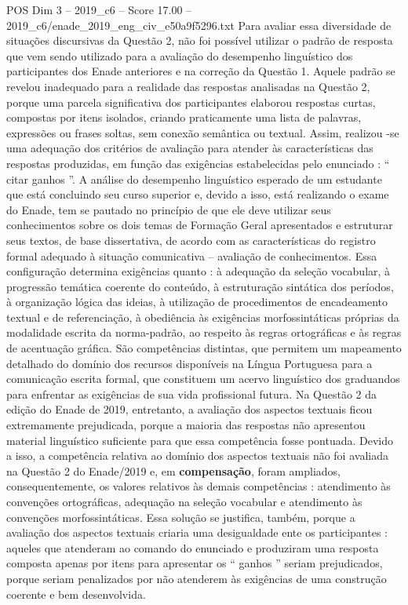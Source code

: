 \begin{textsample}{POS Dim 3 – 2019\_c6 – Score 17.00 – 2019\_c6/enade\_2019\_eng\_civ\_e50a9f5296.txt}
Para avaliar essa diversidade de situações discursivas da Questão 2, não foi possível utilizar o padrão de resposta que vem sendo utilizado para a avaliação do desempenho linguístico dos participantes dos Enade anteriores e na correção da Questão 1.
Aquele padrão se revelou inadequado para a realidade das respostas analisadas na Questão 2, porque uma parcela significativa dos participantes elaborou respostas curtas, compostas por itens isolados, criando praticamente uma lista de palavras, expressões ou frases soltas, sem conexão semântica ou textual.
Assim, realizou -se uma adequação dos critérios de avaliação para atender às características das respostas produzidas, em função das exigências estabelecidas pelo enunciado : “ citar ganhos ”.
A análise do desempenho linguístico esperado de um estudante que está concluindo seu curso superior e, devido a isso, está realizando o exame do Enade, tem se pautado no princípio de que ele deve utilizar seus conhecimentos sobre os dois temas de Formação Geral apresentados e estruturar seus textos, de base dissertativa, de acordo com as características do registro formal adequado à situação comunicativa – avaliação de conhecimentos.
Essa configuração determina exigências quanto : à adequação da seleção vocabular, à progressão temática coerente do conteúdo, à estruturação sintática dos períodos, à organização lógica das ideias, à utilização de procedimentos de encadeamento textual e de referenciação, à obediência às exigências morfossintáticas próprias da modalidade escrita da norma-padrão, ao respeito às regras ortográficas e às regras de acentuação gráfica.
São competências distintas, que permitem um mapeamento detalhado do domínio dos recursos disponíveis na Língua Portuguesa para a comunicação escrita formal, que constituem um acervo linguístico dos graduandos para enfrentar as exigências de sua vida profissional futura.
Na Questão 2 da edição do Enade de 2019, entretanto, a avaliação dos aspectos textuais ficou extremamente prejudicada, porque a maioria das respostas não apresentou material linguístico suficiente para que essa competência fosse pontuada.
Devido a isso, a competência relativa ao domínio dos aspectos textuais não foi avaliada na Questão 2 do Enade/2019 e, em \textbf{compensação}, foram ampliados, consequentemente, os valores relativos às demais competências : atendimento às convenções ortográficas, adequação na seleção vocabular e atendimento às convenções morfossintáticas.
Essa solução se justifica, também, porque a avaliação dos aspectos textuais criaria uma desigualdade ente os participantes : aqueles que atenderam ao comando do enunciado e produziram uma resposta composta apenas por itens para apresentar os “ ganhos ” seriam prejudicados, porque seriam penalizados por não atenderem às exigências de uma construção coerente e bem desenvolvida.

\end{textsample}
